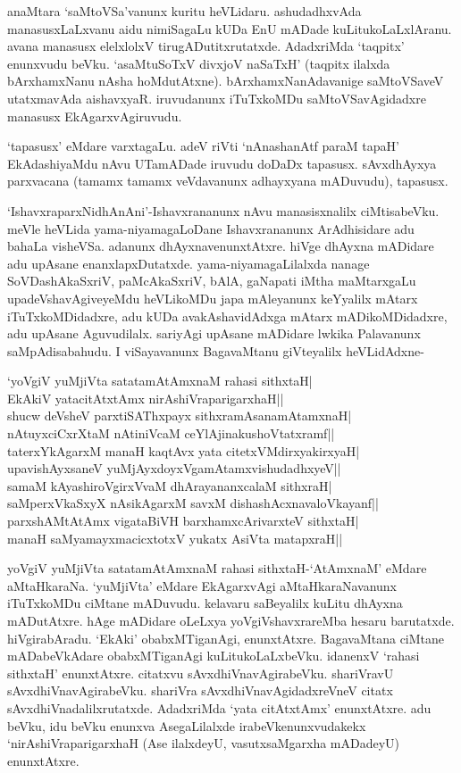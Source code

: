 anaMtara `saMtoVSa'vanunx kuritu heVLidaru. ashudadhxvAda manasusxLaLxvanu aidu nimiSagaLu kUDa EnU mADade kuLitukoLaLxlAranu. avana manasusx elelxlolxV tirugADutitxrutatxde. AdadxriMda `taqpitx' enunxvudu beVku. `asaMtuSoTxV divxjoV naSaTxH' (taqpitx ilalxda bArxhamxNanu nAsha hoMdutAtxne). bArxhamxNanAdavanige saMtoVSaveV utatxmavAda aishavxyaR. iruvudanunx iTuTxkoMDu saMtoVSavAgidadxre manasusx EkAgarxvAgiruvudu.

`tapasusx' eMdare varxtagaLu. adeV riVti `nAnashanAtf paraM tapaH' EkAdashiyaMdu nAvu UTamADade iruvudu doDaDx tapasusx. sAvxdhAyxya parxvacana (tamamx tamamx veVdavanunx adhayxyana mADuvudu), tapasusx.

`IshavxraparxNidhAnAni'-Ishavxrananunx nAvu manasisxnalilx ciMtisabeVku. meVle heVLida yama-niyamagaLoDane Ishavxrananunx ArAdhisidare adu bahaLa visheVSa. adanunx dhAyxnavenunxtAtxre. hiVge dhAyxna mADidare adu upAsane enanxlapxDutatxde. yama-niyamagaLilalxda nanage SoVDashAkaSxriV, paMcAkaSxriV, bAlA, gaNapati iMtha maMtarxgaLu upadeVshavAgiveyeMdu heVLikoMDu japa mAleyanunx keYyalilx mAtarx iTuTxkoMDidadxre, adu kUDa avakAshavidAdxga mAtarx mADikoMDidadxre, adu upAsane Aguvudilalx. sariyAgi upAsane mADidare lwkika Palavanunx saMpAdisabahudu. I viSayavanunx BagavaMtanu giVteyalilx heVLidAdxne-

\begin{shloka}
`yoVgiV yuMjiVta satatamAtAmxnaM rahasi sithxtaH|\\
EkAkiV yatacitAtxtAmx nirAshiVraparigarxhaH||\\
shucw deVsheV parxtiSAThxpayx sithxramAsanamAtamxnaH|\\
nAtuyxciCxrXtaM nAtiniVcaM ceYlAjinakushoVtatxramf||\\
taterxYkAgarxM manaH kaqtAvx yata citetxVMdirxyakirxyaH|\\
upavishAyxsaneV yuMjAyxdoyxVgamAtamxvishudadhxyeV||\\
samaM kAyashiroVgirxVvaM dhArayananxcalaM sithxraH|\\
saMperxVkaSxyX nAsikAgarxM savxM dishashAcxnavaloVkayanf||\\
parxshAMtAtAmx vigataBiVH barxhamxcArivarxteV sithxtaH|\\
manaH saMyamayxmacicxtotxV yukatx AsiVta matapxraH||
\end{shloka}

yoVgiV yuMjiVta satatamAtAmxnaM rahasi sithxtaH-`AtAmxnaM' eMdare aMtaHkaraNa. `yuMjiVta' eMdare EkAgarxvAgi aMtaHkaraNavanunx iTuTxkoMDu ciMtane mADuvudu. kelavaru saBeyalilx kuLitu dhAyxna mADutAtxre. hAge mADidare oLeLxya yoVgiVshavxrareMba hesaru barutatxde. hiVgirabAradu. `EkAki' obabxMTiganAgi, enunxtAtxre. BagavaMtana ciMtane mADabeVkAdare obabxMTiganAgi kuLitukoLaLxbeVku. idanenxV `rahasi sithxtaH' enunxtAtxre. citatxvu sAvxdhiVnavAgirabeVku. shariVravU sAvxdhiVnavAgirabeVku. shariVra sAvxdhiVnavAgidadxreVneV citatx sAvxdhiVnadalilxrutatxde. AdadxriMda `yata citAtxtAmx' enunxtAtxre. adu beVku, idu beVku enunxva AsegaLilalxde irabeVkenunxvudakekx `nirAshiVraparigarxhaH (Ase ilalxdeyU, vasutxsaMgarxha mADadeyU) enunxtAtxre.

